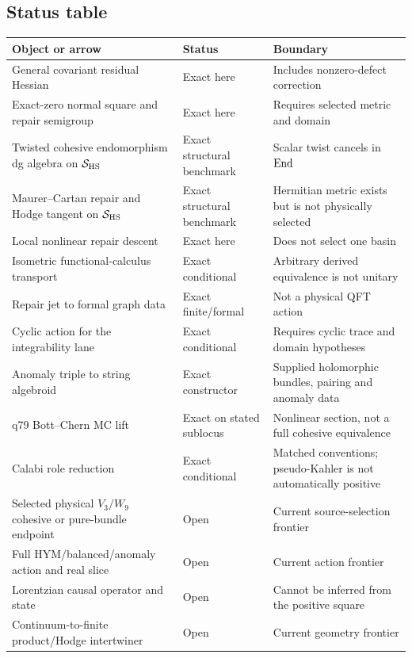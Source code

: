 \documentclass[11pt,a4paper]{article}
\newcommand{\HS}{\mathrm{HS}}
\begin{document}
\subsection{Status table}

\begin{center}
\small
\begin{tabular}{>{\raggedright\arraybackslash}p{}
                >{\raggedright\arraybackslash}p{}
                >{\raggedright\arraybackslash}p{}}
\toprule
Object or arrow & Status & Boundary\\
\midrule
General covariant residual Hessian & Exact here &
Includes nonzero-defect correction\\
Exact-zero normal square and repair semigroup & Exact here &
Requires selected metric and domain\\
Twisted cohesive endomorphism dg algebra on \(\calS_{\HS}\) &
Exact structural benchmark & Scalar twist cancels in \(\operatorname{End}\)\\
Maurer--Cartan repair and Hodge tangent on \(\calS_{\HS}\) &
Exact structural benchmark & Hermitian metric exists but is not physically selected\\
Local nonlinear repair descent & Exact here &
Does not select one basin\\
Isometric functional-calculus transport & Exact conditional &
Arbitrary derived equivalence is not unitary\\
Repair jet to formal graph data & Exact finite/formal &
Not a physical QFT action\\
Cyclic action for the integrability lane & Exact conditional &
Requires cyclic trace and domain hypotheses\\
Anomaly triple to string algebroid & Exact constructor &
Supplied holomorphic bundles, pairing and anomaly data\\
q79 Bott--Chern MC lift & Exact on stated sublocus &
Nonlinear section, not a full cohesive equivalence\\
Calabi role reduction & Exact conditional &
Matched conventions; pseudo-Kahler is not automatically positive\\
Selected physical \(V_3/W_9\) cohesive or pure-bundle endpoint & Open &
Current source-selection frontier\\
Full HYM/balanced/anomaly action and real slice & Open &
Current action frontier\\
Lorentzian causal operator and state & Open &
Cannot be inferred from the positive square\\
Continuum-to-finite product/Hodge intertwiner & Open &
Current geometry frontier\\
\bottomrule
\end{tabular}
\end{center}
\end{document}
